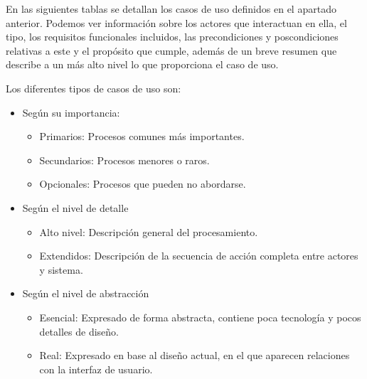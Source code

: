 En las siguientes tablas se detallan los casos de uso definidos en el apartado anterior. Podemos ver información sobre
los actores que interactuan en ella, el tipo, los requisitos funcionales incluidos, las precondiciones y
poscondiciones relativas a este y el propósito que cumple, además de un breve resumen que describe a un más alto
nivel lo que proporciona el caso de uso.

Los diferentes tipos de casos de uso son:

\begin{itemize}
    \item Según su importancia:
    \begin{itemize}
        \item Primarios: Procesos comunes más importantes.
        \item Secundarios: Procesos menores o raros.
        \item Opcionales: Procesos que pueden no abordarse.
    \end{itemize}

    \item Según el nivel de detalle
    \begin{itemize}
        \item Alto nivel: Descripción general del procesamiento.
        \item Extendidos: Descripción de la secuencia de acción completa entre actores y sistema.
    \end{itemize}

    \item Según el nivel de abstracción
    \begin{itemize}
        \item Esencial: Expresado de forma abstracta, contiene poca tecnología y pocos detalles de diseño.
        \item Real: Expresado en base al diseño actual, en el que aparecen relaciones con la interfaz de usuario.
    \end{itemize}
\end{itemize}

